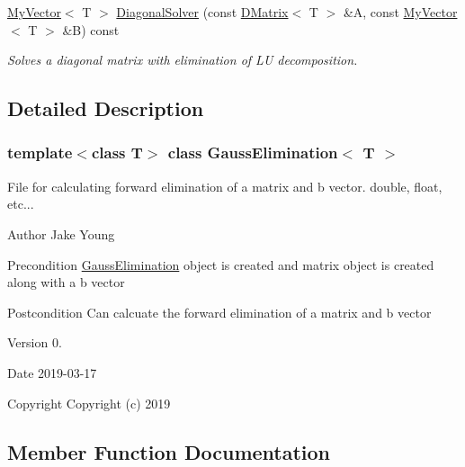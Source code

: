 \begin{DoxyCompactItemize}
\mbox{\hyperlink{class_my_vector}{My\+Vector}}$<$ T $>$ \mbox{\hyperlink{class_gauss_elimination_aee32c76883aa4be9efb0480af4a09407}{Diagonal\+Solver}} (const \mbox{\hyperlink{class_d_matrix}{D\+Matrix}}$<$ T $>$ \&A, const \mbox{\hyperlink{class_my_vector}{My\+Vector}}$<$ T $>$ \&B) const
\begin{DoxyCompactList}\small\item\em Solves a diagonal matrix with elimination of LU decomposition. \end{DoxyCompactList}\end{DoxyCompactItemize}


\subsection{Detailed Description}
\subsubsection*{template$<$class T$>$\newline
class Gauss\+Elimination$<$ T $>$}

File for calculating forward elimination of a matrix and b vector. double, float, etc... 

\begin{DoxyAuthor}{Author}
Jake Young 
\end{DoxyAuthor}
\begin{DoxyPrecond}{Precondition}
\mbox{\hyperlink{class_gauss_elimination}{Gauss\+Elimination}} object is created and matrix object is created along with a b vector 
\end{DoxyPrecond}
\begin{DoxyPostcond}{Postcondition}
Can calcuate the forward elimination of a matrix and b vector 
\end{DoxyPostcond}
\begin{DoxyVersion}{Version}
0. 
\end{DoxyVersion}
\begin{DoxyDate}{Date}
2019-\/03-\/17
\end{DoxyDate}
\begin{DoxyCopyright}{Copyright}
Copyright (c) 2019 
\end{DoxyCopyright}


\subsection{Member Function Documentation}
\mbox{\label{class_gauss_elimination_a44005dd8c4bcba5aa200a9532f75fb5b}} 
